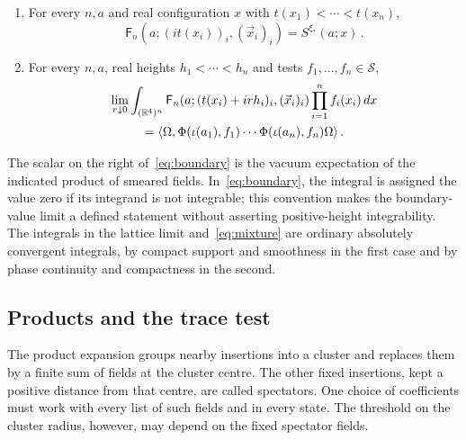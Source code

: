 \begin{definition}
\begin{enumerate}[label=\textup{R\arabic*.},ref=R\arabic*]
\begin{equation}
\mathcal Z_n=\{z\in\C^n:\operatorname{Im}z_1<\cdots<\operatorname{Im}z_n\}\,.
\end{equation}
\item\label{recon:14} For every $n,a$ and real configuration $x$ with $t(x_1)<\cdots<t(x_n)$,
\begin{equation}\label{eq:euclidean-root}
\mathsf F_n(a;(it(x_i))_i,(\vec x_i)_i)=S^{\xi_*}(a;x)\,.
\end{equation}
\item\label{recon:15} For every $n,a$, real heights $h_1<\cdots<h_n$ and tests $f_1,\ldots,f_n\in\mathcal S$,
\begin{multline}\label{eq:boundary}
\lim_{r\downarrow0}\int_{(\mathbb R^4)^n}\mathsf F_n(a;(t(x_i)+irh_i)_i,(\vec x_i)_i)\prod_{i=1}^n f_i(x_i)\,dx\\
=\langle\Omega,\Phi(\iota(a_1),f_1)\cdots\Phi(\iota(a_n),f_n)\Omega\rangle\,.
\end{multline}
\end{enumerate}
\end{definition}

The scalar on the right of~\eqref{eq:boundary} is the vacuum expectation of the indicated product of smeared fields.
In~\eqref{eq:boundary}, the integral is assigned the value zero if its integrand is not integrable; this convention makes the boundary-value limit a defined statement without asserting positive-height integrability.
The integrals in the lattice limit and~\eqref{eq:mixture} are ordinary absolutely convergent integrals, by compact support and smoothness in the first case and by phase continuity and compactness in the second.

\subsection{Products and the trace test}\label{subsec:products}

The product expansion groups nearby insertions into a cluster and replaces them by a finite sum of fields at the cluster centre.
The other fixed insertions, kept a positive distance from that centre, are called spectators.
One choice of coefficients must work with every list of such fields and in every state.
The threshold on the cluster radius, however, may depend on the fixed spectator fields.

